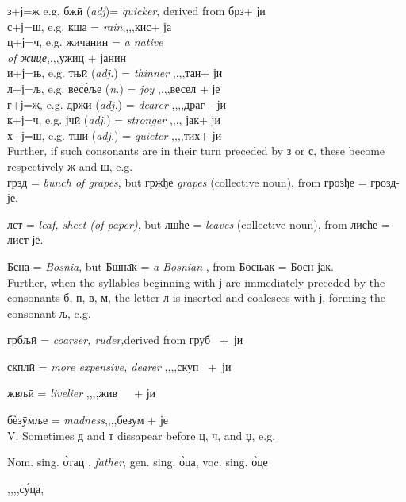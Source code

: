 \newpage

\noindent з+ј=ж e.g. бж\={и} ({\it adj})= \emph{quicker}, derived from брз\quad+ ји\\
с+ј=ш, e.g. кша \femn{} = \emph{rain}\qquad\qquad,,\qquad ,,\quad кис\quad+ ја\\
ц+ј=ч, e.g. жичанин \masc{} = \emph{a native}\\
\hspace*{0.42\linewidth} \emph{of жице},,\qquad ,,\quad ужиц + јанин\\
и+ј=њ, e.g. тњ\={и} ({\it adj.}) = \emph{thinner} \quad ,,\qquad ,,\quad тан\quad + ји\\
л+ј=љ, e.g. вес\'{е}ље ({\it n.}) = \emph{joy} \quad\qquad,,\qquad ,,\quad весел + је\\
г+ј=ж, e.g. држ\={и} ({\it adj.}) = \emph{dearer} \quad,,\qquad ,,\quad драг\quad+ ји\\
к+ј=ч, e.g. јч\={и} ({\it adj.}) = \emph{stronger} \quad ,,\qquad ,, \quad јак\quad + ји\\
х+ј=ш, e.g. тш\={и} ({\it adj.}) = \emph{quieter} \quad,,\qquad ,,\quad тих\quad + ји\\

Further, if such consonants are in their turn preceded by з or с, these become
respectively ж and ш, e.g.\\

грзд \masc{} = \emph{bunch of grapes}, but гржђе \neut{}
\emph{grapes} (collective noun), from грозђе = грозд-је.

лст \masc{} = \emph{leaf, sheet (of paper)}, but лшће \neut{} =
\emph{leaves} (collective noun), from лисће = лист-је.

Бсна \femn{} = \emph{Bosnia}, but Бшн\={а}к \masc{} = \emph{a
Bosnian} \masc{}, from Босњак = Босн-јак.\\

Further, when the syllables beginning with ј are immediately preceded by the
consonants б, п, в, м, the letter л is inserted and coalesces with ј, forming
the consonant љ, e.g.

грбљ\={и} \adj{} = \emph{coarser, ruder,}\qquad derived from груб \ +\  ји

скпл\={и} \adj{} = \emph{more expensive, dearer} ,,\qquad,,\quad скуп \ +\  ји

жвљ\={и} \adj{} = \emph{livelier} \qquad\qquad\qquad\quad,,\qquad,,\quad жив\ \ \ + ји

б\`{е}з\={у}мље \neut = \emph{madness}\qquad\qquad\qquad\quad,,\qquad,,\quad безум + је\\[2pt]

V. Sometimes д and т dissapear before ц, ч, and џ, e.g.

Nom. sing. \`{о}тац \masc, \emph{father}, gen. sing. \`{о}ца, voc. sing. \`{о}це

\quad,,\qquad,,с\'{у}ца,
